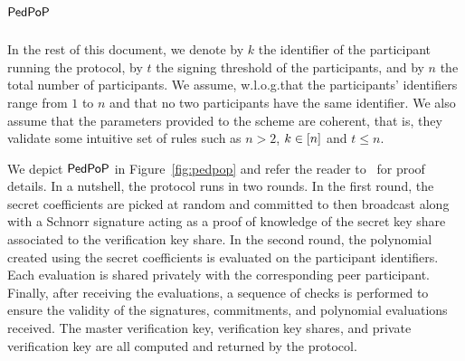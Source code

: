 \section{$\mathsf{PedPoP}$}

In the rest of this document, we denote by $k$ the identifier of the participant running the protocol, by $t$ the signing threshold of the participants, and by
$n$ the total number of participants. We assume, w.l.o.g.\@ that the participants' identifiers range from $1$ to $n$ and that no two participants have the same identifier. We also assume that the parameters provided to the scheme are coherent, that is, they validate some intuitive set of rules such as $n>2$, $k \in [n]$ and $t\leq n$.

We depict $\mathsf{PedPoP}$ in Figure~\ref{fig:pedpop} and refer the reader to~\cite{KomGol2021} for proof details.
In a nutshell, the protocol runs in two rounds.
In the first round, the secret coefficients are picked at random and committed to then broadcast along with a Schnorr signature acting as a proof of knowledge of the secret key share associated to the verification key share.
In the second round, the polynomial created using the secret coefficients is evaluated on the participant identifiers.
Each evaluation is shared privately with the corresponding peer participant.
Finally, after receiving the evaluations, a sequence of checks is performed to ensure the validity of the signatures, commitments, and polynomial evaluations received.
The master verification key, verification key shares, and private verification key are all computed and returned by the protocol.

